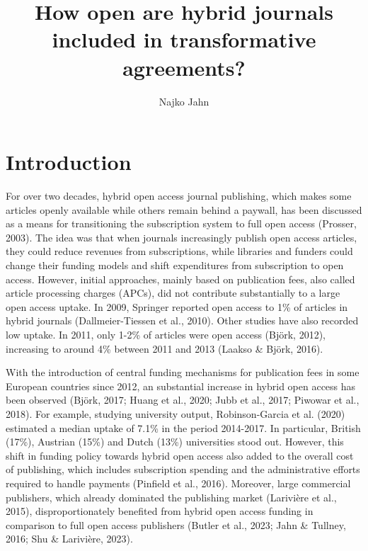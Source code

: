 \documentclass[a4paper,man,floatsintext,longtable,noextraspace,12pt]{apa6}
\title{\textbf{How open are hybrid journals included in transformative agreements?}}
\author{Najko Jahn}
\affiliation{Göttingen State and University Library, University of Göttingen\\
Platz der Göttinger Sieben 1, 37073 Göttingen, Germany\\
najko.jahn@sub.uni-goettingen.de
}
\begin{document}
\maketitle


\hypertarget{introduction}{%
\section{Introduction}\label{introduction}}

For over two decades, hybrid open access journal publishing, which makes
some articles openly available while others remain behind a paywall, has
been discussed as a means for transitioning the subscription system to
full open access (Prosser, 2003). The idea was that when journals
increasingly publish open access articles, they could reduce revenues
from subscriptions, while libraries and funders could change their
funding models and shift expenditures from subscription to open access.
However, initial approaches, mainly based on publication fees, also
called article processing charges (APCs), did not contribute
substantially to a large open access uptake. In 2009, Springer reported
open access to 1\% of articles in hybrid journals (Dallmeier-Tiessen et
al., 2010). Other studies have also recorded low uptake. In 2011, only
1-2\% of articles were open access (Björk, 2012), increasing to around
4\% between 2011 and 2013 (Laakso \& Björk, 2016).

With the introduction of central funding mechanisms for publication fees
in some European countries since 2012, an substantial increase in hybrid
open access has been observed (Björk, 2017; Huang et al., 2020; Jubb et
al., 2017; Piwowar et al., 2018). For example, studying university
output, Robinson-Garcia et al. (2020) estimated a median uptake of 7.1\%
in the period 2014-2017. In particular, British (17\%), Austrian (15\%)
and Dutch (13\%) universities stood out. However, this shift in funding
policy towards hybrid open access also added to the overall cost of
publishing, which includes subscription spending and the administrative
efforts required to handle payments (Pinfield et al., 2016). Moreover,
large commercial publishers, which already dominated the publishing
market (Larivière et al., 2015), disproportionately benefited from
hybrid open access funding in comparison to full open access publishers
(Butler et al., 2023; Jahn \& Tullney, 2016; Shu \& Larivière, 2023).
\end{document}
